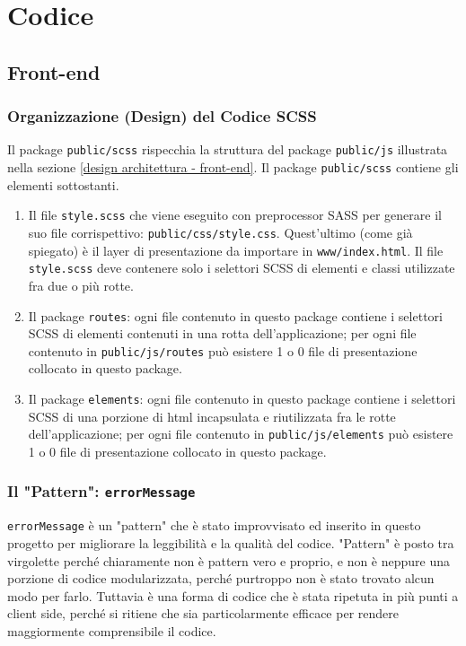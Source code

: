 \section{Codice}

\subsection{Front-end}

\subsubsection{Organizzazione (Design) del Codice SCSS}

Il package \texttt{public/scss} rispecchia la struttura del package \texttt{public/js} illustrata nella sezione \ref{design architettura - front-end}. Il package \texttt{public/scss} contiene gli elementi sottostanti.
\begin{enumerate}
\item
	 Il file \texttt{style.scss} che viene eseguito con preprocessor SASS per generare il suo file corrispettivo: \texttt{public/css/style.css}. Quest'ultimo (come già spiegato) è il layer di presentazione da importare in \texttt{www/index.html}.
	 \newline
	 Il file \texttt{style.scss} deve contenere solo i selettori SCSS di elementi e classi utilizzate fra due o più rotte.
\item
	Il package \texttt{routes}: ogni file contenuto in questo package contiene i selettori SCSS di elementi contenuti in una rotta dell'applicazione; per ogni file contenuto in \texttt{public/js/routes} può esistere 1 o 0 file di presentazione collocato in questo package. 
\item
	Il package \texttt{elements}: ogni file contenuto in questo package contiene i selettori SCSS di una porzione di html incapsulata e riutilizzata fra le rotte dell'applicazione; per ogni file contenuto in \texttt{public/js/elements} può esistere 1 o 0 file di presentazione collocato in questo package. 
\end{enumerate}

\subsubsection{Il "Pattern": \texttt{errorMessage}}

\texttt{errorMessage} è un "pattern" che è stato improvvisato ed inserito in questo progetto per migliorare la leggibilità e la qualità del codice. "Pattern" è posto tra virgolette perché chiaramente non è pattern vero e proprio, e non è neppure una porzione di codice modularizzata, perché purtroppo non è stato trovato alcun modo per farlo. Tuttavia è una forma di codice che è stata ripetuta in più punti a client side, perché si ritiene che sia particolarmente efficace per rendere maggiormente comprensibile il codice.

